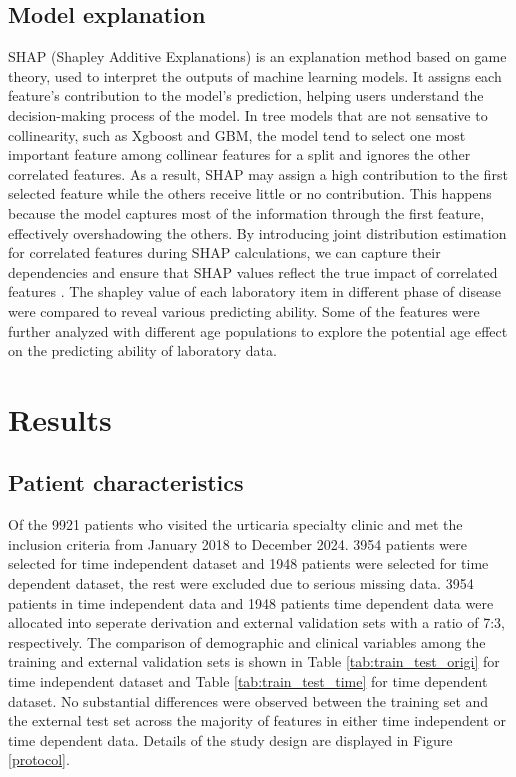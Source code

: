 \documentclass[final,3p,times,authoryear]{elsarticle}
\begin{document}
\subsection{Model explanation}\label{ModelExplanationMethods}
SHAP (Shapley Additive Explanations) is an explanation method based on game theory, used to interpret the outputs of machine learning models. It assigns each feature's contribution to the model's prediction, helping users understand the decision-making process of the model. In tree models that are not sensative to collinearity, such as Xgboost and GBM, the model tend to select one most important feature among collinear features for a split and ignores the other correlated features. As a result, SHAP may assign a high contribution to the first selected feature while the others receive little or no contribution. This happens because the model captures most of the information through the first feature, effectively overshadowing the others. By introducing joint distribution estimation for correlated features during SHAP calculations, we can capture their dependencies and ensure that SHAP values reflect the true impact of correlated features \citep{lundberg2017unified}.
The shapley value of each laboratory item in different phase of disease were compared to reveal various predicting ability. 
Some of the features were further analyzed with different age populations to explore the potential age effect on the predicting ability of laboratory data.


\section{Results}\label{Results}

\subsection{Patient characteristics}\label{PatientCharacteristics}

Of the 9921 patients who visited the urticaria specialty clinic and met the inclusion criteria from January 2018 to December 2024. 3954 patients were selected for time independent dataset and 1948 patients were selected for time dependent dataset, the rest were excluded due to serious missing data. 3954 patients in time independent data and 1948 patients time dependent data were allocated into seperate derivation and external validation sets with a ratio of 7:3, respectively. The comparison of demographic and clinical variables among the training and external validation sets is shown in Table \ref{tab:train_test_origi} for time independent dataset and Table \ref{tab:train_test_time} for time dependent dataset. No substantial differences were observed between the training set and the external test set across the majority of features in either time independent or time dependent data. Details of the study design are displayed in Figure \ref{protocol}.
\end{document}
